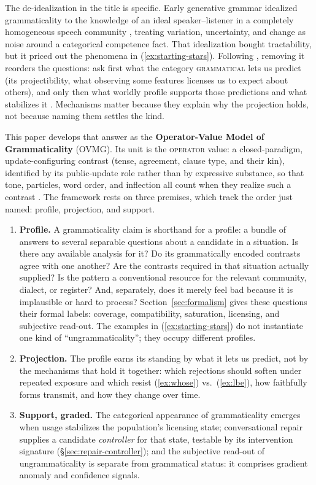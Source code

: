 \documentclass[12pt,letterpaper]{article}
\newcommand{\term}[1]{\textsc{#1}}
\begin{document}
The de-idealization in the title is specific. Early generative grammar idealized grammaticality to the knowledge of an ideal speaker--listener in a completely homogeneous speech community \autocite[3]{chomsky1965}, treating variation, uncertainty, and change as noise around a categorical competence fact. That idealization bought tractability, but it priced out the phenomena in (\ref{ex:starting-stars}). Following \textcite{Goodman1955}, removing it reorders the questions: ask first what the category \term{grammatical} lets us predict (its projectibility, what observing some features licenses us to expect about others), and only then what worldly profile supports those predictions and what stabilizes it \autocite{boyd1999, millikan1999, khalidi2013, khalidi2018nodes, slater2015, reynolds2026kindsProjectibilityProfiles}. Mechanisms matter because they explain why the projection holds, not because naming them settles the kind.

This paper develops that answer as the \textbf{Operator-Value Model of Grammaticality} (OVMG). Its unit is the \term{operator} value: a closed-paradigm, update-configuring contrast (tense, agreement, clause type, and their kin), identified by its public-update role rather than by expressive substance, so that tone, particles, word order, and inflection all count when they realize such a contrast \autocite{reynolds2026operators}. The framework rests on three premises, which track the order just named: profile, projection, and support.

\begin{enumerate}
\item \textbf{Profile.} A grammaticality claim is shorthand for a profile: a bundle of answers to several separable questions about a candidate in a situation. Is there any available analysis for it? Do its grammatically encoded contrasts agree with one another? Are the contrasts required in that situation actually supplied? Is the pattern a conventional resource for the relevant community, dialect, or register? And, separately, does it merely feel bad because it is implausible or hard to process? Section~\ref{sec:formalism} gives these questions their formal labels: coverage, compatibility, saturation, licensing, and subjective read-out. The examples in (\ref{ex:starting-stars}) do not instantiate one kind of \enquote{ungrammaticality}; they occupy different profiles.
\item \textbf{Projection.} The profile earns its standing by what it lets us predict, not by the mechanisms that hold it together: which rejections should soften under repeated exposure and which resist (\ref{ex:whose}) vs.\ (\ref{ex:lbe}), how faithfully forms transmit, and how they change over time.
\item \textbf{Support, graded.} The categorical appearance of grammaticality emerges when usage stabilizes the population's licensing state; conversational repair supplies a candidate \emph{controller} for that state, testable by its intervention signature (\S\ref{sec:repair-controller}); and the subjective read-out of ungrammaticality is separate from grammatical status: it comprises gradient anomaly and confidence signals.
\end{enumerate}
\end{document}
